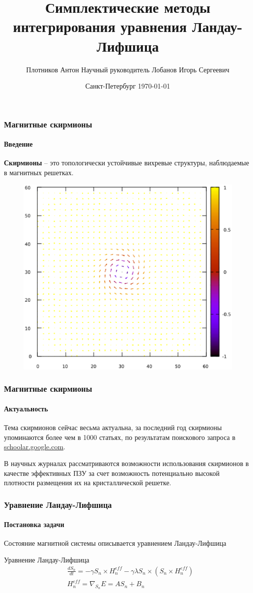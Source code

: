 \documentclass{beamer}
\title[Симп. мет. инт. ур-я Ландау-Лифшица]{Симплектические методы интегрирования\linebreak
уравнения Ландау-Лифшица}
\author[Плотников Антон]{Плотников Антон \linebreak\small
Научный руководитель Лобанов Игорь Сергеевич}
\institute{Кафедра высшей математики}
\date{Санкт-Петербург \today}
\begin{document}
\frame[plain]{\titlepage}

\begin{frame}
    \frametitle{Магнитные скирмионы}
    \framesubtitle{Введение}
    \textbf{Скирмионы} -- это топологически устойчивые вихревые структуры, наблюдаемые в
    магнитных решетках.

    \begin{figure}
        \centering
        \includegraphics[scale=0.3]{../img/simple_skyrmion_1}
    \end{figure}
\end{frame}

\begin{frame}
    \frametitle{Магнитные скирмионы}
    \framesubtitle{Актуальность}
    Тема скирмионов сейчас весьма актуальна, за последний год скирмионы
    упоминаются более чем в 1000 статьях, по результатам поискового запроса в
    \url{schoolar.google.com}.

    В научных журналах рассматриваются возможности использования скирмионов в
    качестве эффективных ПЗУ за счет возможность потенциально высокой плотности
    размещения их на кристаллической решетке.
\end{frame}

\begin{frame}
    \frametitle{Уравнение Ландау-Лифшица}
    \framesubtitle{Постановка задачи}

    Состояние магнитной системы описывается уравнением Ландау-Лифшица

    \begin{block}{Уравнение Ландау-Лифшица}
        \begin{align*}
            &\frac{dS_n}{dt} = -\gamma S_n \times H^{eff}_n - \gamma\lambda S_n \times
            \left(S_n\times H^{eff}_n \right)
            \\
            &H^{eff}_n = \nabla_{S_n}E = AS_n + B_n
        \end{align*}
    \end{block}
\end{frame}
\end{document}
